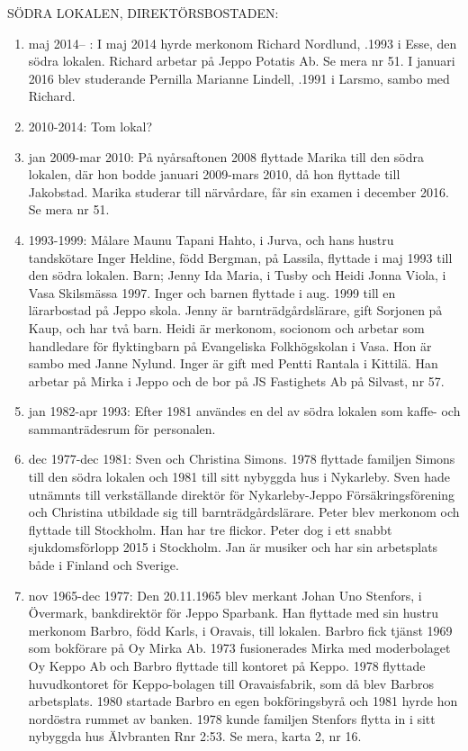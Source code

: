 
SÖDRA LOKALEN, DIREKTÖRSBOSTADEN:
\begin{enumerate}
  \item 	maj 2014--  : I maj 2014 hyrde merkonom Richard Nordlund, .1993 i Esse, den södra lokalen. Richard arbetar på Jeppo Potatis Ab. Se mera nr 51. I januari 2016 blev studerande Pernilla Marianne Lindell, .1991 i Larsmo, sambo med Richard.
  \item 2010-2014: Tom lokal?
  \item jan 2009-mar 2010: På nyårsaftonen 2008 flyttade Marika till den södra lokalen, där hon bodde januari 2009-mars 2010, då hon flyttade till Jakobstad. Marika studerar till närvårdare, får sin examen i december 2016. Se mera nr 51.
  \item 1993-1999: Målare Maunu Tapani Hahto,  i Jurva, och hans hustru tandskötare Inger Heldine, född Bergman,  på Lassila, flyttade i maj 1993 till den södra lokalen.
  Barn;	Jenny Ida Maria,	 i Tusby och	Heidi Jonna Viola,	 i Vasa
  Skilsmässa 1997. Inger och barnen flyttade i aug. 1999 till en lärarbostad på Jeppo skola. Jenny är barnträdgårdslärare, gift Sorjonen på Kaup, och har två barn. Heidi är merkonom, socionom och arbetar som handledare för flyktingbarn på Evangeliska Folkhögskolan i Vasa. Hon är sambo med Janne Nylund. Inger är gift med Pentti Rantala  i Kittilä. Han arbetar på Mirka i Jeppo och de bor på JS Fastighets Ab på Silvast, nr 57.
  \item jan 1982-apr 1993: Efter 1981 användes en del av södra lokalen som kaffe- och sammanträdesrum för personalen.
  \item dec 1977-dec 1981: Sven och Christina Simons. 1978 flyttade familjen Simons till den södra lokalen och 1981 till sitt nybyggda hus i Nykarleby. Sven hade utnämnts till verkställande direktör för Nykarleby-Jeppo Försäkringsförening och Christina utbildade sig till barnträdgårdslärare. Peter blev merkonom och flyttade till Stockholm. Han har tre flickor. Peter dog i ett snabbt sjukdomsförlopp 2015 i Stockholm. Jan är musiker och har sin arbetsplats både i Finland och Sverige.
  \item nov 1965-dec 1977: 	Den 20.11.1965 blev merkant Johan Uno Stenfors,  i Övermark, bankdirektör för Jeppo Sparbank. Han flyttade med sin hustru merkonom Barbro, född Karls,  i Oravais, till lokalen. Barbro fick tjänst 1969 som bokförare på Oy Mirka Ab. 1973 fusionerades Mirka med moderbolaget Oy Keppo Ab och Barbro flyttade till kontoret på Keppo. 1978 flyttade huvudkontoret för Keppo-bolagen till Oravaisfabrik, som då blev Barbros arbetsplats. 1980 startade Barbro en egen bokföringsbyrå och 1981 hyrde hon nordöstra rummet av banken. 1978 kunde familjen Stenfors flytta in i sitt nybyggda hus Älvbranten Rnr 2:53. Se mera, karta 2, nr 16.

\end{enumerate}
